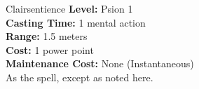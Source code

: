 {Clairsentience}
{
	\textbf{Level:}
	Psion 1\\
	\textbf{Casting Time:}
	1 mental action\\
	\textbf{Range:}
	1.5 meters\\
	\textbf{Cost:}
	1 power point\\
	\textbf{Maintenance Cost:}
	None (Instantaneous)\\
}
{
	As the  spell, except as noted here.
}